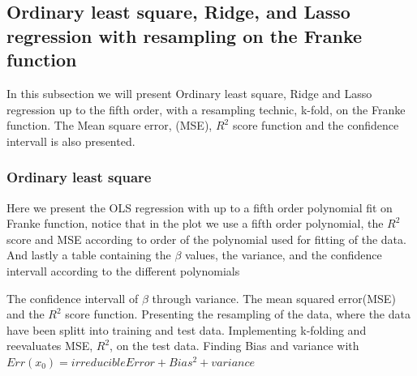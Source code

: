 

\subsection{Ordinary least square, Ridge, and Lasso regression with resampling on the Franke function}

In this subsection we will present Ordinary least square, Ridge and Lasso regression up to the fifth order, with a resampling technic, k-fold, on the Franke function. The Mean square error, (MSE), $R^2$ score function and the confidence intervall is also presented. 


\subsubsection{Ordinary least square}
Here we present the OLS regression with up to a fifth order polynomial fit on Franke function, notice that in the plot we use a fifth order polynomial, the $R^2$ score and MSE according to order of the polynomial used for fitting of the data. And lastly a table containing the $\beta$ values, the variance, and the confidence intervall according to the different polynomials

The confidence intervall of $\beta$ through variance. The mean squared error(MSE) and the $R^2$ score function. 
Presenting the resampling of the data, where the data have been splitt into training and test data. 
Implementing k-folding and reevaluates MSE, $R^2$, on the test data. Finding Bias and variance with $Err(x_0) = irreducible Error + Bias^2 + variance$



